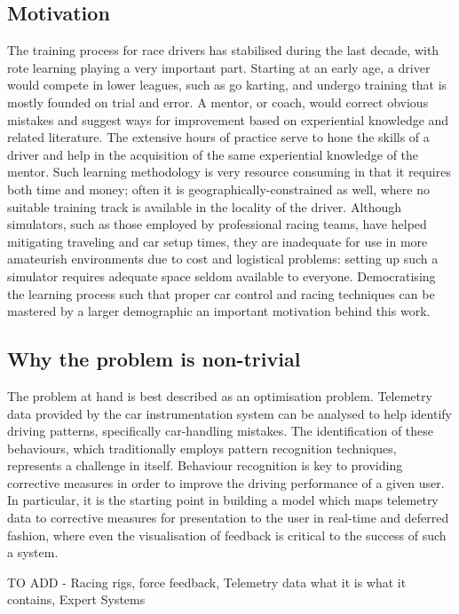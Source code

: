 \documentclass{article}
\begin{document}
\subsection{Motivation}
The training process for race drivers has stabilised during the last decade, with rote learning playing a very important part. Starting at an early age, a driver would compete in lower leagues, such as go karting, and undergo training that is mostly founded on trial and error. A mentor, or coach, would correct obvious mistakes and suggest ways for improvement based on experiential knowledge and related literature. The extensive hours of practice serve to hone the skills of a driver and help in the acquisition of the same experiential knowledge of the mentor. Such learning methodology is very resource consuming in that it requires both time and money; often it is geographically-constrained as well, where no suitable training track is available in the locality of the driver. Although simulators, such as those employed by professional racing teams, have helped mitigating traveling and car setup times, they are inadequate for use in more amateurish environments due to cost and logistical problems: setting up such a simulator requires adequate space seldom available to everyone. Democratising the learning process such that proper car control and racing techniques can be mastered by a larger demographic an important motivation behind this work.

\subsection{Why the problem is non-trivial}
The problem at hand is best described as an optimisation problem. Telemetry data provided by the car instrumentation system can be analysed to help identify driving patterns, specifically car-handling mistakes. The identification of these behaviours, which traditionally employs pattern recognition techniques, represents a challenge in itself. Behaviour recognition is key to providing corrective measures in order to improve the driving performance of a given user. In particular, it is the starting point in building a model which maps telemetry data to corrective measures for presentation to the user in real-time and deferred fashion, where even the visualisation of feedback is critical to the success of such a system.

\newpage


TO ADD - Racing rigs, force feedback, Telemetry data what it is what it contains, Expert Systems
\end{document}
